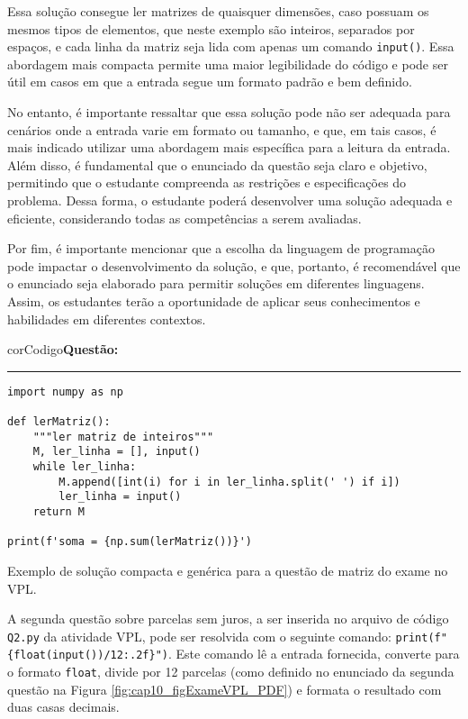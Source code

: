 Essa solução consegue ler matrizes de quaisquer dimensões, caso possuam os mesmos tipos de elementos, que neste exemplo são inteiros, separados por espaços, e cada linha da matriz seja lida com apenas um comando \verb|input()|. Essa abordagem mais compacta permite uma maior legibilidade do código e pode ser útil em casos em que a entrada segue um formato padrão e bem definido.

No entanto, é importante ressaltar que essa solução pode não ser adequada para cenários onde a entrada varie em formato ou tamanho, e que, em tais casos, é mais indicado utilizar uma abordagem mais específica para a leitura da entrada. Além disso, é fundamental que o enunciado da questão seja claro e objetivo, permitindo que o estudante compreenda as restrições e especificações do problema. Dessa forma, o estudante poderá desenvolver uma solução adequada e eficiente, considerando todas as competências a serem avaliadas.

Por fim, é importante mencionar que a escolha da linguagem de programação pode impactar o desenvolvimento da solução, e que, portanto, é recomendável que o enunciado seja elaborado para permitir soluções em diferentes linguagens. Assim, os estudantes terão a oportunidade de aplicar seus conhecimentos e habilidades em diferentes contextos.

\begin{listing}[!ht]
\begin{myboxCode}{corCodigo}{\textbf{Questão: } }\vspace{3mm}
\hrule
\begin{verbatim}
import numpy as np

def lerMatriz(): 
    """ler matriz de inteiros"""
    M, ler_linha = [], input()
    while ler_linha:
        M.append([int(i) for i in ler_linha.split(' ') if i])
        ler_linha = input()
    return M
  
print(f'soma = {np.sum(lerMatriz())}')
\end{verbatim}
\end{myboxCode}
\caption{Exemplo de solução compacta e genérica para a questão de matriz do exame no VPL.}
\label{lst:ExameVPLsolucao2Q1}
\end{listing}

A segunda questão sobre parcelas sem juros, a ser inserida no arquivo de código \verb|Q2.py| da atividade VPL, pode ser resolvida com o seguinte comando: \verb|print(f"{float(input())/12:.2f}")|. Este comando lê a entrada fornecida, converte para o formato \verb|float|, divide por 12 parcelas (como definido no enunciado da segunda questão na Figura \ref{fig:cap10_figExameVPL_PDF}) e formata o resultado com duas casas decimais.


